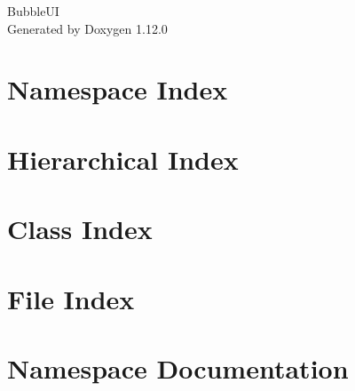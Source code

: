 \documentclass[twoside]{book}
\newcommand{\+}{\discretionary{\mbox{\scriptsize$\hookleftarrow$}}{}{}}
\newcommand{\clearemptydoublepage}{%
    \newpage{\pagestyle{empty}\cleardoublepage}%
  }
\begin{document}
  \raggedbottom
    \hypersetup{pageanchor=false,
                bookmarksnumbered=true,
                pdfencoding=unicode
               }
  \begin{titlepage}
  \vspace*{7cm}
  \begin{center}%
  {\Large Bubble\+UI}\\
  \vspace*{1cm}
  {\large Generated by Doxygen 1.12.0}\\
  \end{center}
  \end{titlepage}
  \clearemptydoublepage
  \tableofcontents
  \clearemptydoublepage
  \hypersetup{pageanchor=true}
\chapter{Namespace Index}

\chapter{Hierarchical Index}

\chapter{Class Index}

\chapter{File Index}

\chapter{Namespace Documentation}






\end{document}
